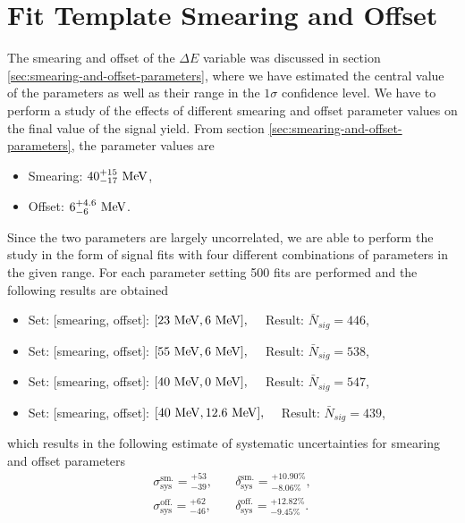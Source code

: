\section{Fit Template Smearing and Offset}
The smearing and offset of the $\Delta E$ variable was discussed in section \ref{sec:smearing-and-offset-parameters}, where we have estimated the central value of the parameters as well as their range in the $1\sigma$ confidence level. We have to perform a study of the effects of different smearing and offset parameter values on the final value of the signal yield. From section \ref{sec:smearing-and-offset-parameters}, the parameter values are
\begin{itemize}
	\item Smearing: $40_{-17}^{+15}\mathrm{~MeV}$,
	\item Offset: $6_{-6}^{+4.6}\mathrm{~MeV}$.
\end{itemize}
Since the two parameters are largely uncorrelated, we are able to perform the study in the form of signal fits with four different combinations of parameters in the given range. For each parameter setting 500 fits are performed and the following results are obtained
\begin{itemize}
	\item Set: [smearing, offset]: $[23\mathrm{~MeV},6\mathrm{~MeV}],\quad$ Result: $ \bar N {}_{sig} = 446 $,
	\item Set: [smearing, offset]: $[55\mathrm{~MeV},6\mathrm{~MeV}],\quad$ Result: $ \bar N {}_{sig} = 538 $,
	\item Set: [smearing, offset]: $[40\mathrm{~MeV},0\mathrm{~MeV}],\quad$ Result: $ \bar N {}_{sig} = 547 $,
	\item Set: [smearing, offset]: $[40\mathrm{~MeV},12.6\mathrm{~MeV}],\quad$ Result: $ \bar N {}_{sig} = 439 $,
\end{itemize}
which results in the following estimate of systematic uncertainties for smearing and offset parameters
\begin{align}
\sigma_{\mathrm{sys}}^{\mathrm{sm.}} = {}^{+53}_{-39},&\quad \delta_{\mathrm{sys}}^{\mathrm{sm.}} = {}^{+10.90\%}_{-8.06\%}, \\
\sigma_{\mathrm{sys}}^{\mathrm{off.}} = {}^{+62}_{-46},&\quad \delta_{\mathrm{sys}}^{\mathrm{off.}} = {}^{+12.82\%}_{-9.45\%}.
\end{align}

